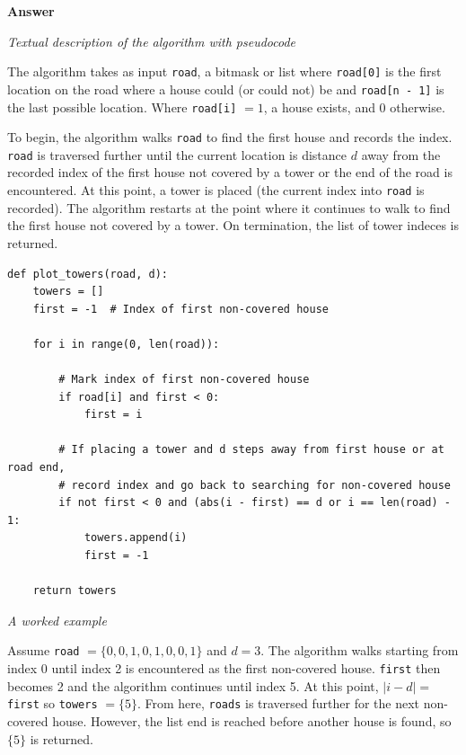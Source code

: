 \documentclass{article}
\begin{document}

\textbf{Answer}

\textit{Textual description of the algorithm with pseudocode}

The algorithm takes as input \texttt{road}, a bitmask or list where 
\texttt{road[0]} is the first location on the road where a house could (or
could not) be and \texttt{road[n - 1]} is the last possible location. Where 
\texttt{road[i]} $= 1$, a house exists, and 0 otherwise.

To begin, the algorithm walks \texttt{road} to find the first house and records
the index. \texttt{road} is traversed further until the current location is 
distance $d$ away from the recorded index of the first house not covered by a 
tower or the end of the road is encountered. At this point, a tower is placed 
(the current index into \texttt{road} is recorded). The algorithm restarts at 
the point where it continues to walk to find the first house not covered by a 
tower. On termination, the list of tower indeces is returned.

\begin{verbatim}
def plot_towers(road, d):
    towers = [] 
    first = -1  # Index of first non-covered house

    for i in range(0, len(road)):

        # Mark index of first non-covered house
        if road[i] and first < 0:
            first = i
        
        # If placing a tower and d steps away from first house or at road end, 
        # record index and go back to searching for non-covered house
        if not first < 0 and (abs(i - first) == d or i == len(road) - 1:
            towers.append(i)
            first = -1

    return towers
\end{verbatim}

\textit{A worked example}

Assume \texttt{road} $= \{0, 0, 1, 0, 1, 0, 0, 1\}$ and $d = 3$. The 
algorithm walks starting from index 0 until index 2 is encountered as the first
non-covered house. \texttt{first} then becomes 2 and the algorithm continues
until index 5. At this point, $|i - d| = $ \texttt{first} so \texttt{towers} $=
\{5\}$. From here, \texttt{roads} is traversed further for the next non-covered 
house. However, the list end is reached before another house is found, so 
$\{5\}$ is returned. 
\end{document}
